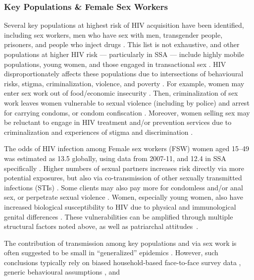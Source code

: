 \subsubsection{Key Populations \& Female Sex Workers}\label{intro.hiv.epi.kp}
Several key populations at highest risk of HIV acquisition have been identified, including
sex workers, men who have sex with men, transgender people, prisoners, and people who inject drugs
\cite{Mathers2008,Beyrer2012,Baral2012,Scorgie2012,Shannon2015,Rubenstein2016,WHO2016kp,Jin2021}.
This list is not exhaustive, and other populations at higher HIV risk --- particularly in SSA ---
include highly mobile populations, young women, and those engaged in transactional sex
\cite{Oldenburg2014,Wamoyi2016,Camlin2019,Cheuk2020,Day2020,Khalifa2022}.
HIV disproportionately affects these populations due to intersections of
behavioural risks, stigma, criminalization, violence, and poverty \cite{WHO2016kp}.
For example, women may enter sex work out of food/economic insecurity \cite{Scorgie2012}.
Then, criminalization of sex work leaves women vulnerable to sexual violence (including by police)
and arrest for carrying condoms, or condom confiscation \cite{Scorgie2012,Shannon2015}.
Moreover, women selling sex may be reluctant to engage in HIV treatment and/or prevention services
due to criminalization and experiences of stigma and discrimination \cite{Lancaster2016,Spyrelis2022}.
\par
The odds of HIV infection among Female sex workers (FSW)
\vs women aged 15--49 was estimated as 13.5 globally, using data from 2007-11,
and 12.4 in SSA specifically \cite{Baral2012}.
Higher numbers of sexual partners increases risk directly via more potential exposures,
but also via co-transmission of other sexually transmitted infections (STIs) \cite{Scorgie2012}.
Some clients may also pay more for condomless and/or anal sex,
or perpetrate sexual violence \cite{Scorgie2012,Shannon2015}.
Women, especially young women, also have increased biological susceptibility to HIV
due to physical and immunological genital differences \cite{Yi2013}.
These vulnerabilities can be amplified through multiple structural factors noted above,
as well as patriarchal attitudes~\cite{Scorgie2012,Shannon2015}.
\par
The contribution of transmission among key populations and via sex work
is often suggested to be small in ``generalized'' epidemics \cite{Leclerc2008,Shubber2014}.
However, such conclusions typically rely on
biased household-based face-to-face survey data \cite{Langhaug2010,Lowndes2012},
generic behavioural assumptions \cite{Shubber2014}, and

